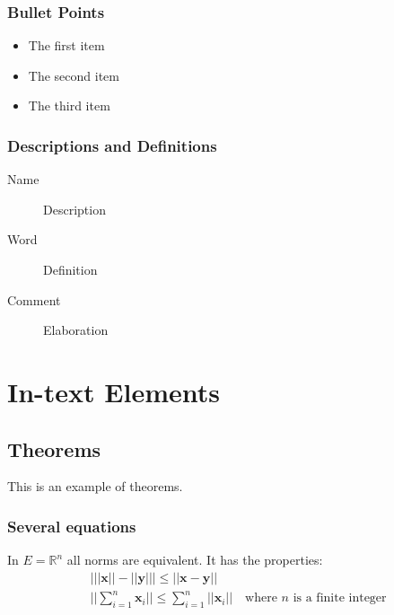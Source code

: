 \documentclass[11pt,fleqn]{book} %
\begin{document}
\subsection{Bullet Points}

\begin{itemize}
\item The first item
\item The second item
\item The third item
\end{itemize}

\subsection{Descriptions and Definitions}

\begin{description}
\item[Name] Description
\item[Word] Definition
\item[Comment] Elaboration
\end{description}


\chapter{In-text Elements}

\section{Theorems}

This is an example of theorems.

\subsection{Several equations}

\begin{theorem}
In $E=\mathbb{R}^n$ all norms are equivalent. It has the properties:
\begin{align}
& \big| ||\mathbf{x}|| - ||\mathbf{y}|| \big|\leq || \mathbf{x}- \mathbf{y}||\\
&  ||\sum_{i=1}^n\mathbf{x}_i||\leq \sum_{i=1}^n||\mathbf{x}_i||\quad\text{where $n$ is a finite integer}
\end{align}
\end{theorem}
\end{document}
